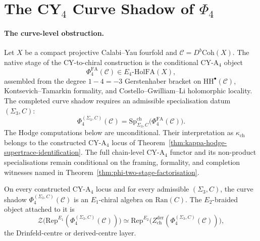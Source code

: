 \providecommand{\cC}{\mathcal{C}}
\providecommand{\cA}{\mathcal{A}}
\providecommand{\cO}{\mathcal{O}}
\providecommand{\cH}{\mathcal{H}}
\providecommand{\cZ}{\mathcal{Z}}
\providecommand{\Coh}{\mathrm{Coh}}
\providecommand{\HH}{\mathrm{HH}}
\providecommand{\HC}{\mathrm{HC}}
\providecommand{\Perf}{\mathrm{Perf}}
\providecommand{\PV}{\mathrm{PV}}
\providecommand{\Sym}{\mathrm{Sym}}
\providecommand{\Ran}{\mathrm{Ran}}
\providecommand{\StabOp}{\mathrm{Stab}}
\providecommand{\RepE}{\mathrm{Rep}^{E_1}}
\providecommand{\Drin}{\mathrm{Drin}}
\providecommand{\Zder}{Z^{\mathrm{der}}_{\mathrm{ch}}}
\providecommand{\Eone}{E_1}
\providecommand{\Etwo}{E_2}
\providecommand{\Ethree}{E_3}
\providecommand{\Efour}{E_4}
\providecommand{\SpCh}{\mathrm{Sp}^{\mathrm{ch}}}
\providecommand{\PhiFA}{\Phi^{\mathrm{FA}}}
\providecommand{\HolFA}{\mathrm{HolFA}}
\providecommand{\RWk}[1]{\mathsf{RW}_{#1}}
\providecommand{\bP}{\mathbb{P}}
\providecommand{\bS}{\mathbb{S}}
\providecommand{\Z}{\mathbb{Z}}
\providecommand{\C}{\mathbb{C}}

\section{The CY$_4$ Curve Shadow of $\Phi_4$}
\label{sec:cy4-kapranov-output}

\paragraph{The curve-level obstruction.}
Let \(X\) be a compact projective Calabi--Yau fourfold and
\(\cC=D^b\Coh(X)\). The native stage of the CY-to-chiral construction is
the conditional CY-A\(_4\) object
\[
  \PhiFA_4(\cC)\in \Efour\text{-}\HolFA(X),
\]
assembled from the degree \(1-4=-3\) Gerstenhaber bracket on
\(\HH^\bullet(\cC)\), Kontsevich--Tamarkin formality, and
Costello--Gwilliam--Li holomorphic locality. The completed curve shadow
requires an admissible specialisation datum \((\Sigma_3,C)\):
\[
  \Phi_4^{(\Sigma_3,C)}(\cC)
  =
  \SpCh_{\Sigma_3,C}\bigl(\PhiFA_4(\cC)\bigr).
\]
The Hodge computations below are unconditional. Their interpretation as
\(\kappa_{\mathrm{ch}}\) belongs to the constructed CY-A\(_4\) locus of
Theorem~\ref{thm:kappa-hodge-supertrace-identification}. The full
chain-level CY-A\(_4\) functor and its non-product specialisations remain
conditional on the framing, formality, and completion witnesses named in
Theorem~\ref{thm:phi-two-stage-factorisation}.

\begin{proposition}[Native curve output at \(d=4\)]
\label{prop:cy4-native-e1-output}
On every constructed CY-A\(_4\) locus and for every admissible
\((\Sigma_3,C)\), the curve shadow
\(\Phi_4^{(\Sigma_3,C)}(\cC)\) is an \(\Eone\)-chiral algebra on
\(\Ran(C)\). The \(\Etwo\)-braided object attached to it is
\[
  \cZ\bigl(\RepE(\Phi_4^{(\Sigma_3,C)}(\cC))\bigr)
  \simeq
  \mathrm{Rep}^{\Etwo}\bigl(\Zder(\Phi_4^{(\Sigma_3,C)}(\cC))\bigr),
\]
the Drinfeld-centre or derived-centre layer.
\end{proposition}

